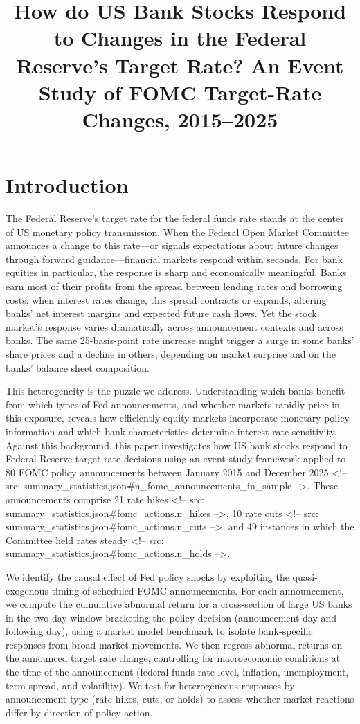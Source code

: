 \documentclass{article}
\title{How do US Bank Stocks Respond to Changes in the Federal Reserve's Target Rate? An Event Study of FOMC Target-Rate Changes, 2015--2025}
\author{}
\date{}
\begin{document}
\section{Introduction}

The Federal Reserve's target rate for the federal funds rate stands at the center of US monetary policy transmission. When the Federal Open Market Committee announces a change to this rate—or signals expectations about future changes through forward guidance—financial markets respond within seconds. For bank equities in particular, the response is sharp and economically meaningful. Banks earn most of their profits from the spread between lending rates and borrowing costs; when interest rates change, this spread contracts or expands, altering banks' net interest margins and expected future cash flows. Yet the stock market's response varies dramatically across announcement contexts and across banks. The same 25-basis-point rate increase might trigger a surge in some banks' share prices and a decline in others, depending on market surprise and on the banks' balance sheet composition.

This heterogeneity is the puzzle we address. Understanding which banks benefit from which types of Fed announcements, and whether markets rapidly price in this exposure, reveals how efficiently equity markets incorporate monetary policy information and which bank characteristics determine interest rate sensitivity. Against this background, this paper investigates how US bank stocks respond to Federal Reserve target rate decisions using an event study framework applied to 80 FOMC policy announcements between January 2015 and December 2025 <!-- src: summary_statistics.json#n_fomc_announcements_in_sample -->. These announcements comprise 21 rate hikes <!-- src: summary_statistics.json#fomc_actions.n_hikes -->, 10 rate cuts <!-- src: summary_statistics.json#fomc_actions.n_cuts -->, and 49 instances in which the Committee held rates steady <!-- src: summary_statistics.json#fomc_actions.n_holds -->.

We identify the causal effect of Fed policy shocks by exploiting the quasi-exogenous timing of scheduled FOMC announcements. For each announcement, we compute the cumulative abnormal return for a cross-section of large US banks in the two-day window bracketing the policy decision (announcement day and following day), using a market model benchmark to isolate bank-specific responses from broad market movements. We then regress abnormal returns on the announced target rate change, controlling for macroeconomic conditions at the time of the announcement (federal funds rate level, inflation, unemployment, term spread, and volatility). We test for heterogeneous responses by announcement type (rate hikes, cuts, or holds) to assess whether market reactions differ by direction of policy action.
\end{document}
